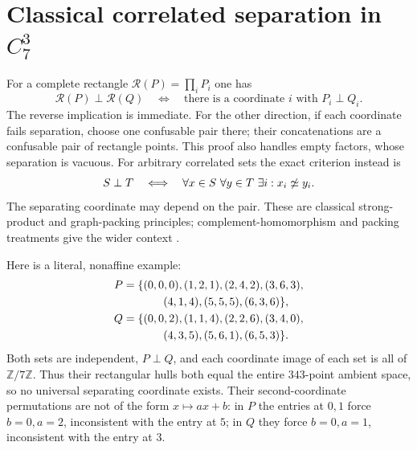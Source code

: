 \documentclass[11pt,a4paper]{article}
\theoremstyle{definition}
\theoremstyle{remark}
\newcommand{\Z}{\mathbb Z}
\newcommand{\conf}{\mathrel{\simeq}}
\newcommand{\sep}{\mathrel{\perp}}
\begin{document}
\appendix
\section{Classical correlated separation in \texorpdfstring{$C_7^3$}{C7\string^3}}\label{app:c7}
For a complete rectangle $\mathcal R(P)=\prod_i P_i$ one has
\begin{equation}\label{eq:rectangle}
 \mathcal R(P)\sep\mathcal R(Q)
 \quad\Longleftrightarrow\quad
 \text{there is a coordinate $i$ with }P_i\sep Q_i.
\end{equation}
The reverse implication is immediate. For the other direction, if
each coordinate fails separation, choose one confusable pair there;
their concatenations are a confusable pair of rectangle points.
This proof also handles empty factors, whose separation is vacuous.
For arbitrary correlated sets the exact criterion instead is
\begin{equation}\label{eq:routed}
 S\sep T\quad\Longleftrightarrow\quad
 \forall x\in S\ \forall y\in T\ \exists i:
 x_i\not\conf y_i.
\end{equation}
The separating coordinate may depend on the pair. These are classical
strong-product and graph-packing principles; complement-homomorphism
and packing treatments give the wider context \cite{sauer,zuiddam}.

Here is a literal, nonaffine example:
\begin{align*}
 P={}&\{(0,0,0),(1,2,1),(2,4,2),(3,6,3),\\
     &\hspace{8mm}(4,1,4),(5,5,5),(6,3,6)\},\\
 Q={}&\{(0,0,2),(1,1,4),(2,2,6),(3,4,0),\\
     &\hspace{8mm}(4,3,5),(5,6,1),(6,5,3)\}.
\end{align*}
Both sets are independent, $P\sep Q$, and each coordinate image of
each set is all of $\Z/7\Z$. Thus their rectangular hulls both equal
the entire $343$-point ambient space, so no universal separating
coordinate exists. Their second-coordinate permutations are not of
the form $x\mapsto ax+b$: in $P$ the entries at $0,1$ force
$b=0,a=2$, inconsistent with the entry at $5$; in $Q$ they force
$b=0,a=1$, inconsistent with the entry at $3$.
\end{document}
